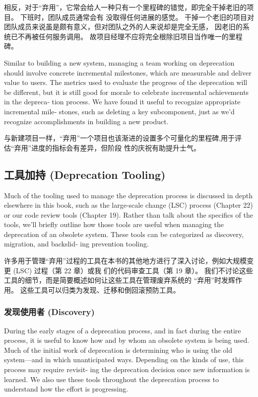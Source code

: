 \documentclass[10pt,a4paper,UTF8]{ctexart}
\begin{document}
相反，对于“弃用”，它常会给人一种只有一个里程碑的错觉，即完全干掉老旧的项目。 下班时，团队成员通常会有
没取得任何进展的感觉。 干掉一个老旧的项目对团队成员来说虽是颇有意义，但对团队之外的人来说却是完全无感，
因老旧的系统已不再被任何服务调用。 故项目经理不应将完全根除旧项目当作唯一的里程碑。

Similar to building a new system, managing a team working on deprecation should involve concrete
incremental milestones, which are measurable and deliver value to users. The metrics used to
evaluate the progress of the deprecation will be different, but it is still good for morale to
celebrate incremental achievements in the depreca‐ tion process. We have found it useful to
recognize appropriate incremental mile‐ stones, such as deleting a key subcomponent, just as we’d
recognize accomplishments in building a new product.

与新建项目一样，“弃用”一个项目也该渐进的设置多个可量化的里程碑,用于评估“弃用”进度的指标会有差异，但阶段
 性的庆祝有助提升士气。

\subsection{工具加持 (Deprecation Tooling)}
\label{sec:orga6c1712}

Much of the tooling used to manage the deprecation process is discussed in depth elsewhere in this
book, such as the large-scale change (LSC) process (Chapter 22) or our code review tools (Chapter
19). Rather than talk about the specifics of the tools, we’ll briefly outline how those tools are
useful when managing the deprecation of an obsolete system. These tools can be categorized as
discovery, migration, and backslid‐ ing prevention tooling.


许多用于管理“弃用”过程的工具在本书的其他地方进行了深入讨论，例如大规模变更 (LSC) 过程（第 22 章）或我
们的代码审查工具（第 19 章）。 我们不讨论这些工具的细节，而是简要概述如何让这些工具在管理废弃系统的
“弃用”时发辉作用。 这些工具可以归类为发现、迁移和倒回滚预防工具。

\subsubsection{发现使用者 (Discovery)}
\label{sec:org33bce0b}

During the early stages of a deprecation process, and in fact during the entire process, it is
useful to know how and by whom an obsolete system is being used. Much of the initial work of
deprecation is determining who is using the old system—and in which unanticipated ways. Depending on
the kinds of use, this process may require revisit‐ ing the deprecation decision once new
information is learned. We also use these tools throughout the deprecation process to understand how
the effort is progressing.
\end{document}
